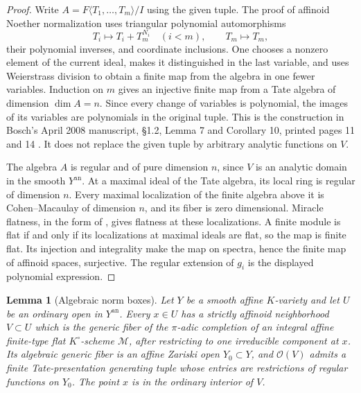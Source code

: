 \documentclass[11pt,a4paper]{article}
\numberwithin{equation}{section}
\newtheorem{lemma}[theorem]{Lemma}
\theoremstyle{definition}
\theoremstyle{remark}
\begin{document}
\begin{proof}
Write $A=F\langle T_1,\ldots,T_m\rangle/I$ using the given tuple.
The proof of affinoid Noether normalization uses triangular
polynomial automorphisms
\[
 T_i\longmapsto T_i+T_m^{N_i}\quad(i<m),\qquad T_m\longmapsto T_m,
\]
their polynomial inverses, and coordinate inclusions. One chooses
a nonzero element of the current ideal, makes it distinguished in
the last variable, and uses Weierstrass division to obtain a finite
map from the algebra in one fewer variables. Induction on $m$
gives an injective finite map from a Tate algebra of dimension
$\dim A=n$. Since every change of variables is polynomial, the
images of its variables are polynomials in the original tuple.
This is the construction in Bosch's April 2008 manuscript,
\S1.2, Lemma 7 and Corollary 10, printed pages 11 and 14
\cite{Bosch08}. It does not replace the given tuple by arbitrary
analytic functions on $V$.

The algebra $A$ is regular and of pure dimension $n$, since $V$
is an analytic domain in the smooth $Y^{\mathrm{an}}$. At a
maximal ideal of the Tate algebra, its local ring is regular of
dimension $n$. Every maximal localization of the finite algebra
above it is Cohen--Macaulay of dimension $n$, and its fiber is
zero dimensional. Miracle flatness, in the form of
\cite[Tag 00R4]{Stacks}, gives flatness at these localizations.
A finite module is flat if and only if its localizations at
maximal ideals are flat, so the map is finite flat. Its injection
and integrality make the map on spectra, hence the finite map
of affinoid spaces, surjective. The regular extension of $g_i$
is the displayed polynomial expression.
\end{proof}

\begin{lemma}[Algebraic norm boxes]
\label{lem:r5-algebraic-norm-boxes}
Let $Y$ be a smooth affine $K$-variety and let $U$ be an ordinary
open in $Y^{\mathrm{an}}$. Every $x\in U$ has a strictly affinoid
neighborhood $V\subset U$ which is the generic fiber of the
$\pi$-adic completion of an integral affine finite-type flat
$K^\circ$-scheme $\mathcal M$, after restricting to one irreducible
component at $x$. Its algebraic generic fiber is an affine
Zariski open $Y_0\subset Y$, and $\mathscr O(V)$ admits a
finite Tate-presentation generating tuple whose entries are
restrictions of regular functions on $Y_0$.
The point $x$ is in the ordinary interior of $V$.
\end{lemma}
\end{document}
